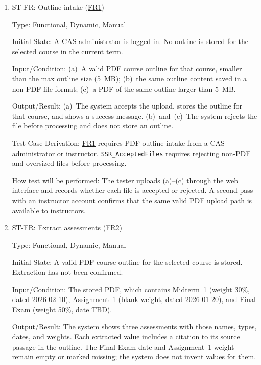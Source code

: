 \documentclass[12pt, titlepage]{article}
\newcounter{stnum}
\newcommand{\halink}[1]{\href{https://github.com/shivyam/cas-course-optimization/blob/main/pdfs/HazardAnalysis/HazardAnalysis.pdf}{#1}}
\newcommand{\frlink}[1]{\href{https://github.com/shivyam/cas-course-optimization/blob/main/pdfs/SRS-IEEE/SRS.pdf}{FR#1}}
\begin{document}
\begin{enumerate}

\item{ST-FR\thestnum \label{ST_Intake_Data}: Outline intake (\frlink{1})\\}

Type: Functional, Dynamic, Manual

Initial State: A CAS administrator is logged in. No outline is stored for the selected course in the current term.

Input/Condition: (a)~A valid PDF course outline for that course, smaller than the max outline size (5~MB); (b)~the same outline content saved in a non-PDF file format; (c)~a PDF of the same outline larger than 5~MB.

Output/Result: (a)~The system accepts the upload, stores the outline for that course, and shows a success message. (b)~and~(c)~The system rejects the file before processing and does not store an outline.

Test Case Derivation: \frlink{1} requires PDF outline intake from a CAS administrator or instructor. \halink{\texttt{SSR\_AcceptedFiles}} requires rejecting non-PDF and oversized files before processing.

How test will be performed: The tester uploads (a)--(c) through the web interface and records whether each file is accepted or rejected. A second pass with an instructor account confirms that the same valid PDF upload path is available to instructors.


\item{ST-FR\thestnum \label{ST_Extract_Assessment}: Extract assessments (\frlink{2})\\}

Type: Functional, Dynamic, Manual

Initial State: A valid PDF course outline for the selected course is stored. Extraction has not been confirmed.

Input/Condition: The stored PDF, which contains Midterm~1 (weight 30\%, dated 2026-02-10), Assignment~1 (blank weight, dated 2026-01-20), and Final Exam (weight 50\%, date TBD).

Output/Result: The system shows three assessments with those names, types, dates, and weights. Each extracted value includes a citation to its source passage in the outline. The Final Exam date and Assignment~1 weight remain empty or marked missing; the system does not invent values for them.


\end{enumerate}
\end{document}
